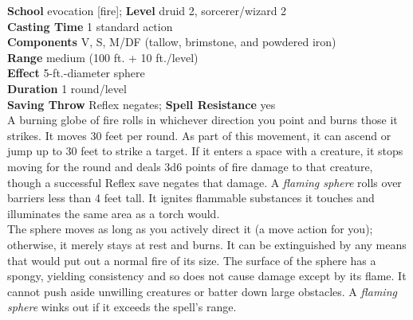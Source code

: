 \textbf{School} evocation [fire]; \textbf{Level} druid 2, sorcerer/wizard 2\\
\textbf{Casting Time} 1 standard action\\
\textbf{Components} V, S, M/DF (tallow, brimstone, and powdered iron)\\
\textbf{Range }medium (100 ft. + 10 ft./level)\\
\textbf{Effect} 5-ft.-diameter sphere\\
\textbf{Duration} 1 round/level\\
\textbf{Saving Throw} Reflex negates; \textbf{Spell Resistance} yes\\
A burning globe of fire rolls in whichever direction you point and burns those it strikes. It moves 30 feet per round. As part of this movement, it can ascend or jump up to 30 feet to strike a target. If it enters a space with a creature, it stops moving for the round and deals 3d6 points of fire damage to that creature, though a successful Reflex save negates that damage. A \textit{flaming sphere }rolls over barriers less than 4 feet tall. It ignites flammable substances it touches and illuminates the same area as a torch would.\\
The sphere moves as long as you actively direct it (a move action for you); otherwise, it merely stays at rest and burns. It can be extinguished by any means that would put out a normal fire of its size. The surface of the sphere has a spongy, yielding consistency and so does not cause damage except by its flame. It cannot push aside unwilling creatures or batter down large obstacles. A \textit{flaming sphere }winks out if it exceeds the spell's range.\\
